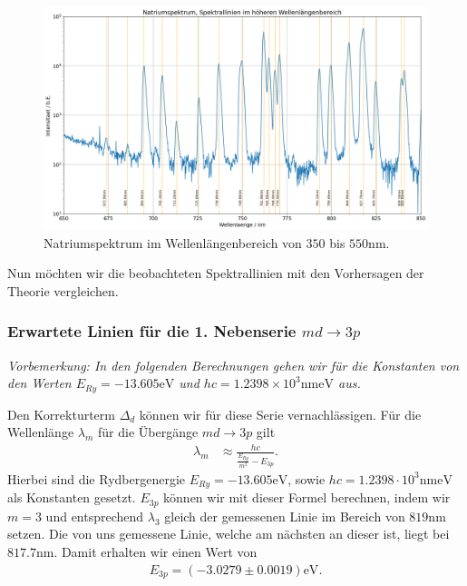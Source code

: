 \begin{figure}[H]
  \centering
  \includegraphics[width=.9\textwidth]{files/plots/na_spek_650_850.png}
  \caption{Natriumspektrum im Wellenlängenbereich von $350$ bis $550\si{\nano\meter}$.}
  \label{fig:na_spek_650_850}
\end{figure}

Nun möchten wir die beobachteten Spektrallinien mit den Vorhersagen der Theorie vergleichen.

\subsubsection*{Erwartete Linien für die 1. Nebenserie $md \to 3p$}

\textit{Vorbemerkung: In den folgenden Berechnungen gehen wir für die Konstanten von den Werten $E_{Ry} = -13.605\si{\electronvolt}$ und $hc = 1.2398 \times 10^3 \si{\nano\meter \electronvolt}$ aus.}

Den Korrekturterm $\Delta_{d}$ können wir für diese Serie vernachlässigen. Für die Wellenlänge $\lambda_m$ für die Übergänge $md \to 3p$ gilt
\begin{align}
  \lambda_m &\approx \frac{hc}{\frac{E_{Ry}}{m^2} - E_{3p}}.
\end{align}
Hierbei sind die Rydbergenergie $E_{Ry} = -13.605\unit{\electronvolt}$, sowie $hc = 1.2398 \cdot 10^{3} \si{\nano\meter \electronvolt}$ als Konstanten gesetzt. $E_{3p}$ können wir mit dieser Formel berechnen, indem wir $m = 3$ und entsprechend $\lambda_3$ gleich der gemessenen Linie im Bereich von $819\si{\nano\meter}$ setzen. Die von uns gemessene Linie, welche am nächsten an dieser ist, liegt bei $817.7\si{\nano\meter}$. Damit erhalten wir einen Wert von
\begin{align}
  E_{3p} = (-3.0279 \pm 0.0019)\si{\electronvolt}.
\end{align}

